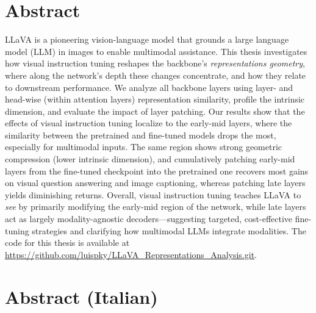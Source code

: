 \chapter*{Abstract}

LLaVA is a pioneering vision-language model that grounds a large language model (LLM) in images to enable multimodal assistance. This thesis investigates how visual instruction tuning reshapes the backbone's \emph{representations geometry}, where along the network's depth these changes concentrate, and how they relate to downstream performance. We analyze all backbone layers using layer- and head-wise (within attention layers) representation similarity, profile the intrinsic dimension, and evaluate the impact of layer patching. Our results show that the effects of visual instruction tuning localize to the early-mid layers, where the similarity between the pretrained and fine-tuned models drops the most, especially for multimodal inputs. The same region shows strong geometric compression (lower intrinsic dimension), and cumulatively patching early-mid layers from the fine-tuned checkpoint into the pretrained one recovers most gains on visual question answering and image captioning, whereas patching late layers yields diminishing returns. Overall, visual instruction tuning teaches LLaVA to \emph{see} by primarily modifying the early-mid region of the network, while late layers act as largely modality-agnostic decoders---suggesting targeted, cost-effective fine-tuning strategies and clarifying how multimodal LLMs integrate modalities. The code for this thesis is available at \url{https://github.com/luispky/LLaVA_Representations_Analysis.git}.

\chapter*{Abstract (Italian)}

